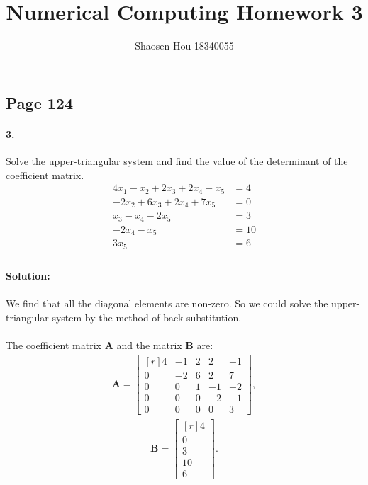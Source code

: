 \documentclass{article}  %
\title{Numerical Computing Homework 3}
\author{Shaosen Hou 18340055}
\begin{document}
 
    \maketitle
        \subsection*{Page 124} 
        \paragraph{3.}Solve the upper-triangular system and find the value of the determinant of the coefficient matrix.
        \begin{align*}
            4x_1 - x_2 + 2x_3 + 2x_4 - x_5 &= 4 \\
            -2x_2 + 6x_3 + 2x_4 + 7x_5 &= 0 \\
            x_3 - x_4 - 2x_5 &= 3 \\
            -2x_4 - x_5 &= 10 \\
            3x_5 &= 6 \\
        \end{align*}
        \paragraph{Solution:}
        \paragraph{}We find that all the diagonal elements are non-zero. So we could solve the upper-triangular system by the method of back substitution.
        \paragraph{}The coefficient matrix $\bm{A}$ and the matrix $\bm{B}$ are: 
        \begin{align*}
            \bm{A=}  \begin{bmatrix*}[r]
                4 & -1 & 2 & 2 & -1 \\
                0 & -2 & 6 & 2 & 7 \\
                0 & 0 & 1 & -1 & -2 \\
                0 & 0 & 0 & -2 & -1 \\
                0 & 0 & 0 & 0 & 3 
            \end{bmatrix*},
        \end{align*}
        \begin{align*}
            \bm{B=}  \begin{bmatrix*}[r]
                4 \\
                0 \\
                3 \\
                10 \\
                6  
            \end{bmatrix*}.
        \end{align*}
\end{document}
